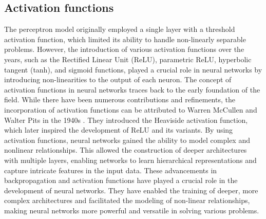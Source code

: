 \subsection{Activation functions}

The perceptron model originally employed a single layer with a threshold activation function, which limited its ability to handle non-linearly separable problems. However, the introduction of various activation functions over the years, such as the Rectified Linear Unit (ReLU), parametric ReLU, hyperbolic tangent (tanh), and sigmoid functions, played a crucial role in neural networks by introducing non-linearities to the output of each neuron. The concept of activation functions in neural networks traces back to the early foundation of the field. While there have been numerous contributions and refinements, the incorporation of activation functions can be attributed to Warren McCullen and Walter Pits in the 1940s \cite{mcculloch1943logical}. They introduced the Heaviside activation function, which later inspired the development of ReLU and its variants.
By using activation functions, neural networks gained the ability to model complex and nonlinear relationships. This allowed the construction of deeper architectures with multiple layers, enabling networks to learn hierarchical representations and capture intricate features in the input data.
These advancements in backpropagation and activation functions have played a crucial role in the development of neural networks. They have enabled the training of deeper, more complex architectures and facilitated the modeling of non-linear relationships, making neural networks more powerful and versatile in solving various problems.
